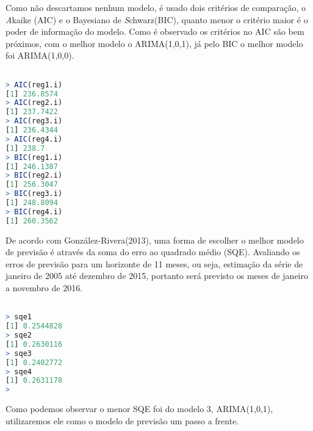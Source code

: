 \documentclass[a4paper,12pt,oneside,titlepage]{article}
\begin{document}
Como não descartamos nenhum modelo, é usado dois critérios de comparação, o \textit Akaike (AIC) e o Bayesiano de \textit Schwarz(BIC), quanto menor o critério maior é o poder de informação do modelo. Como é observado os critérios no AIC são bem próximos, com o melhor modelo o ARIMA(1,0,1), já pelo BIC o melhor modelo foi ARIMA(1,0,0).

\begin{lstlisting}[language=R,caption={ADF}]

> AIC(reg1.i)
[1] 236.8574
> AIC(reg2.i)
[1] 237.7422
> AIC(reg3.i)
[1] 236.4344
> AIC(reg4.i)
[1] 238.7
> BIC(reg1.i)
[1] 246.1387
> BIC(reg2.i)
[1] 256.3047
> BIC(reg3.i)
[1] 248.8094
> BIC(reg4.i)
[1] 260.3562

\end{lstlisting}

De acordo com González-Rivera(2013), uma forma de escolher o melhor modelo de previsão é através da soma do erro ao quadrado médio (SQE). Avaliando os erros de previsão para um horizonte de 11 meses, ou seja, estimação da série de janeiro de 2005 até dezembro de 2015, portanto será previsto os meses de janeiro a novembro de 2016.

\begin{lstlisting}[language=R,caption={ADF}]

> sqe1
[1] 0.2544828
> sqe2
[1] 0.2630116
> sqe3
[1] 0.2402772
> sqe4
[1] 0.2631178
> 

\end{lstlisting}

Como podemos observar o menor SQE foi do modelo 3, ARIMA(1,0,1), utilizaremos ele como o modelo de previsão um passo a frente.
\end{document}
